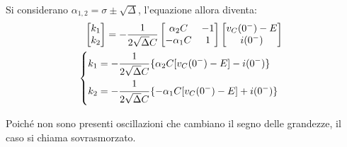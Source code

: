 \documentclass{article}
\numberwithin{equation}{subsection}
\begin{document}
Si considerano $\alpha_{1,2}=\sigma\pm\sqrt\Delta$, l'equazione allora diventa:
\begin{gather}
    \begin{bmatrix}
        k_1\\k_2
    \end{bmatrix}=\displaystyle-\frac{1}{2\sqrt{\Delta} C}\begin{bmatrix}
        \alpha_2C&-1\\-\alpha_1C&1
    \end{bmatrix}\begin{bmatrix}
        v_C(0^-)-E\\i(0^-)
    \end{bmatrix}\\
    \begin{cases}
        k_1=\displaystyle-\frac{\strut 1}{\strut 2\sqrt{\Delta} C}\{\alpha_2C[v_C(0^-)-E]-i(0^-)\}\\
        k_2=\displaystyle-\frac{\strut 1}{\strut 2\sqrt{\Delta} C}\{-\alpha_1C[v_C(0^-)-E]+i(0^-)\}
    \end{cases}
\end{gather}
 
Poiché non sono presenti oscillazioni che cambiano il segno delle grandezze, il caso si chiama sovrasmorzato. 
\end{document}

